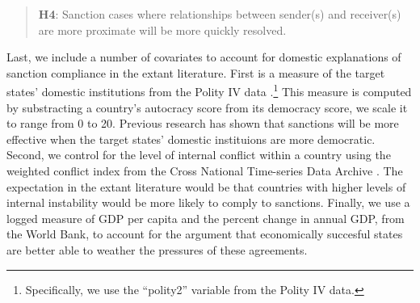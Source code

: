 \begin{quote}
	\textbf{H4}: Sanction cases where relationships between sender(s) and receiver(s) are more proximate will be more quickly resolved.
\end{quote}





Last, we include a number of covariates to account for domestic explanations of sanction compliance in the extant literature. First is a measure of the target states' domestic institutions from the Polity IV data \citep{marshall2002polity}.\footnote{Specifically, we use the ``polity2'' variable from the Polity IV data.} This measure is computed by substracting a country's autocracy score from its democracy score, we scale it to range from 0 to 20. Previous research has shown that sanctions will be more effective when the target states' domestic instituions are more democratic. Second, we control for the level of internal conflict within  a country using the weighted conflict index from the Cross National Time-series Data Archive \citep{banks2011cross}. The expectation in the extant literature would be that countries with higher levels of internal instability would be more likely to comply to sanctions. Finally, we use a logged measure of GDP per capita and the percent change in annual GDP, from the World Bank, to account for the argument that economically succesful states are better able to weather the pressures of these agreements.
